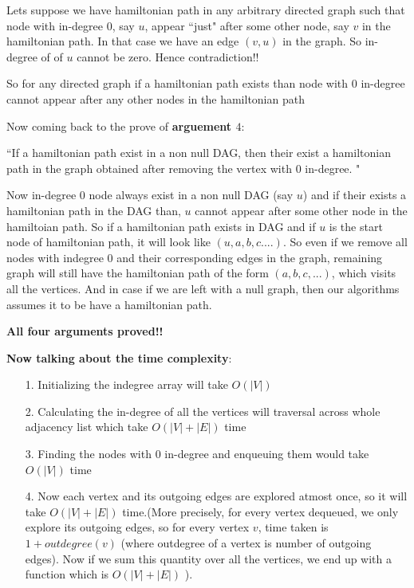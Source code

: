 \documentclass[answers]{exam}
\begin{document}
\begin{questions}
\begin{enumerate}
\begin{solution}
Lets suppose we have hamiltonian path in any arbitrary directed graph such that node with in-degree $0$, say $u$, appear ``just" after some other node, say $v$ in the hamiltonian path. In that case we have an edge $(v,u)$ in the graph. So in-degree of of $u$ cannot be zero. Hence contradiction!!\par
So for any  directed graph if a hamiltonian path exists than node with $0$ in-degree cannot appear after any other nodes in the hamiltonian path
\par
Now coming back to the prove of \textbf{arguement $4$}:\par
``If a hamiltonian path exist in a non null DAG, then their exist a hamiltonian path in the graph obtained after removing the vertex with $0$ in-degree. "\par
Now in-degree $0$ node always exist in a non null DAG (say $u$) and if their exists a hamiltonian path in the DAG than, $u$ cannot appear after some other node in the hamiltoian path. So if a hamiltonian path exists in DAG and if $u$ is the start node of hamiltonian path, it will look like $(u,a,b,c....)$. So even if we remove all nodes with indegree $0$ and their corresponding edges in the graph, remaining graph will still have the hamiltonian path of the form $(a,b,c,...)$, which visits all the vertices.
And in case if we are left with a null graph, then our algorithms assumes it to be have a hamiltonian path.
\par


\textbf{All four arguments proved!! }\par




\textbf{Now talking about the time complexity}:
\begin{enumerate}
    \item [1.] Initializing the indegree array will take $O(|V|)$
    \item [2.]  Calculating the in-degree of all the vertices will traversal across whole adjacency list which take $O(|V|+|E|)$ time
    \item [3.] Finding the nodes with $0$ in-degree and enqueuing them would take $O(|V|)$ time
    \item [4. ] Now each vertex and its outgoing edges are explored atmost once, so it will take $O(|V|+|E|)$ time.(More precisely, for every vertex dequeued, we only explore its outgoing edges, so for every vertex $v$, time taken is $1+outdegree(v)$ (where outdegree of a vertex is number of outgoing edges). Now if we sum this quantity over all the vertices, we end up with a function which is $O(|V|+|E|)$  ).
\end{enumerate}


\end{solution}
\end{enumerate}
\end{questions}
\end{document}

